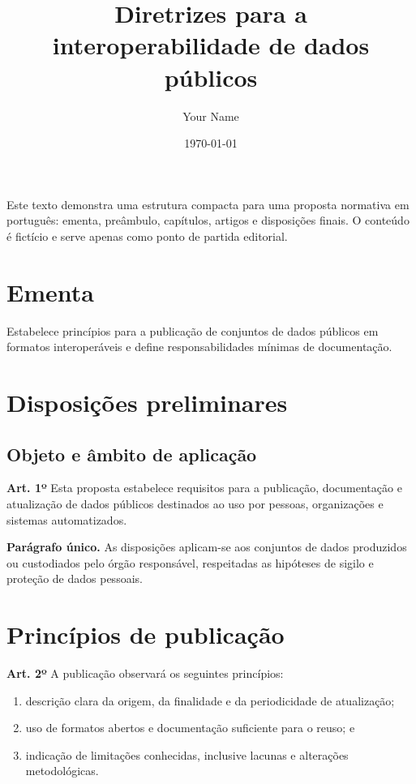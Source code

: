 \documentclass[12pt,a4paper]{br-lex}
\title{Diretrizes para a interoperabilidade de dados públicos}
\author{Your Name}
\date{\today}
\begin{document}
\maketitle

\begin{center}
\begin{minipage}{0.88\textwidth}
\small
Este texto demonstra uma estrutura compacta para uma proposta normativa em
português: ementa, preâmbulo, capítulos, artigos e disposições finais. O
conteúdo é fictício e serve apenas como ponto de partida editorial.
\end{minipage}
\end{center}

\section*{Ementa}
Estabelece princípios para a publicação de conjuntos de dados públicos em
formatos interoperáveis e define responsabilidades mínimas de documentação.

\section{Disposições preliminares}
\subsection{Objeto e âmbito de aplicação}
\textbf{Art. 1º} Esta proposta estabelece requisitos para a publicação,
documentação e atualização de dados públicos destinados ao uso por pessoas,
organizações e sistemas automatizados.

\textbf{Parágrafo único.} As disposições aplicam-se aos conjuntos de dados
produzidos ou custodiados pelo órgão responsável, respeitadas as hipóteses de
sigilo e proteção de dados pessoais.

\section{Princípios de publicação}
\textbf{Art. 2º} A publicação observará os seguintes princípios:
\begin{enumerate}
  \item descrição clara da origem, da finalidade e da periodicidade de
    atualização;
  \item uso de formatos abertos e documentação suficiente para o reuso; e
  \item indicação de limitações conhecidas, inclusive lacunas e alterações
    metodológicas.
\end{enumerate}
\end{document}
